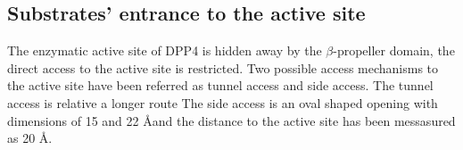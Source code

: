 \subsection{Substrates' entrance to the active site}

The enzymatic active site of DPP4 is hidden away by the $\beta$-propeller domain, the direct access to the active site is restricted. Two possible access mechanisms to the active site have been referred as tunnel access and side access. The tunnel access is  relative a longer route The side access is an oval shaped opening with dimensions of 15 and 22 \AA and the distance to the active site has been messasured as 20 \AA.~\cite{Engel_2003}